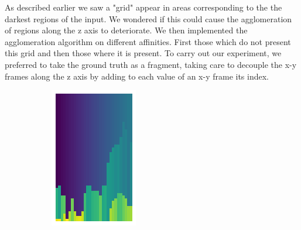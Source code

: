 As described earlier we saw a "grid" appear in areas corresponding to the the darkest regions of the input. We wondered if this could cause the agglomeration of regions along the z axis to deteriorate.
We then implemented the agglomeration algorithm on different affinities. First those which do not present this grid and then those where it is present. To carry out our experiment, we preferred to take the ground truth as a fragment, taking care to decouple the x-y frames along the z axis by adding to each value of an x-y frame its index.\\

\begin{figure}[!htbp]
    \centering
    \begin{subfigure}[t]{0.31\textwidth}
        \centering
        \includegraphics[height=1\textwidth]{./images/agglo.png}
    \end{subfigure}%
    ~ 
    \begin{subfigure}[t]{0.31\textwidth}
        \centering

\end{subfigure}
\end{figure}

